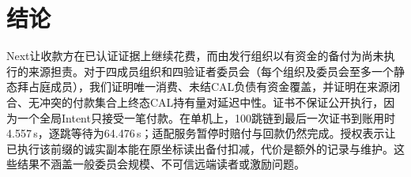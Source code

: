 \section{结论}
\label{sec:conclusion}

Next让收款方在已认证证据上继续花费，而由发行组织以有资金的备付为尚未执行的来源担责。对于四成员组织和四验证者委员会（每个组织及委员会至多一个静态拜占庭成员），我们证明唯一消费、未结CAL负债有资金覆盖，并证明在来源闭合、无冲突的付款集合上终态CAL持有量对延迟中性。证书不保证公开执行，因为一个全局Intent只接受一笔付款。在单机上，100跳链到最后一次证书到账用时4.557\,s，逐跳等待为64.476\,s；适配服务暂停时赔付与回款仍然完成。授权表示让已执行该前缀的诚实副本能在原坐标读出备付扣减，代价是额外的记录与维护。这些结果不涵盖一般委员会规模、不可信远端读者或激励问题。